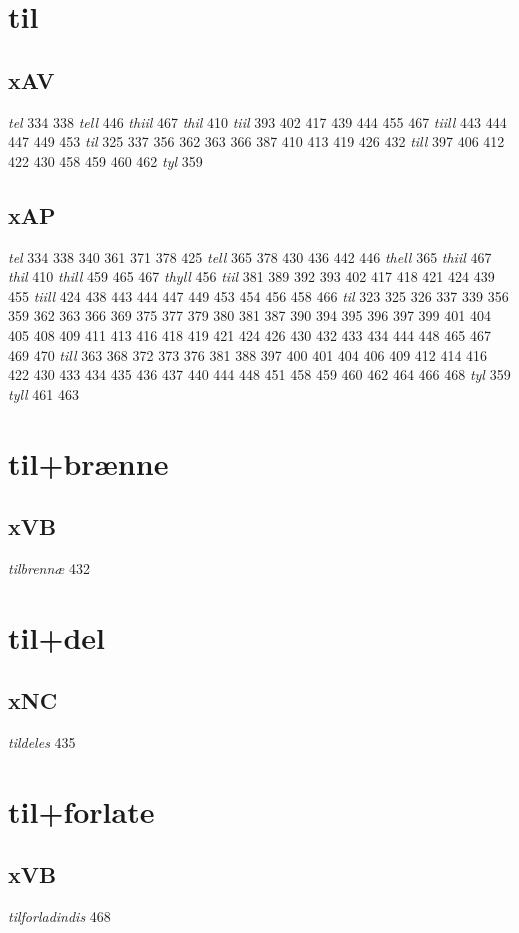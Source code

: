 \documentclass[a4paper,twocolumn]{article}
\begin{document}
\section{til}
\label{sec:org21f91bc}
\subsection{xAV}
\label{sec:orgdca9847}
\emph{tel} 334 338 \emph{tell} 446 \emph{thiil} 467 \emph{thil} 410 \emph{tiil} 393 402 417 439 444 455 467 \emph{tiill} 443 444 447 449 453 \emph{til} 325 337 356 362 363 366 387 410 413 419 426 432 \emph{till} 397 406 412 422 430 458 459 460 462 \emph{tyl} 359 
\subsection{xAP}
\label{sec:orgd35a8b5}
\emph{tel} 334 338 340 361 371 378 425 \emph{tell} 365 378 430 436 442 446 \emph{thell} 365 \emph{thiil} 467 \emph{thil} 410 \emph{thill} 459 465 467 \emph{thyll} 456 \emph{tiil} 381 389 392 393 402 417 418 421 424 439 455 \emph{tiill} 424 438 443 444 447 449 453 454 456 458 466 \emph{til} 323 325 326 337 339 356 359 362 363 366 369 375 377 379 380 381 387 390 394 395 396 397 399 401 404 405 408 409 411 413 416 418 419 421 424 426 430 432 433 434 444 448 465 467 469 470 \emph{till} 363 368 372 373 376 381 388 397 400 401 404 406 409 412 414 416 422 430 433 434 435 436 437 440 444 448 451 458 459 460 462 464 466 468 \emph{tyl} 359 \emph{tyll} 461 463 
\section{til+brænne}
\label{sec:org4475599}
\subsection{xVB}
\label{sec:org88cda64}
\emph{tilbrennæ} 432 
\section{til+del}
\label{sec:org15479ba}
\subsection{xNC}
\label{sec:orgfc00580}
\emph{tildeles} 435 
\section{til+forlate}
\label{sec:orgfe16153}
\subsection{xVB}
\label{sec:orgb9263f7}
\emph{tilforladindis} 468 
\end{document}
